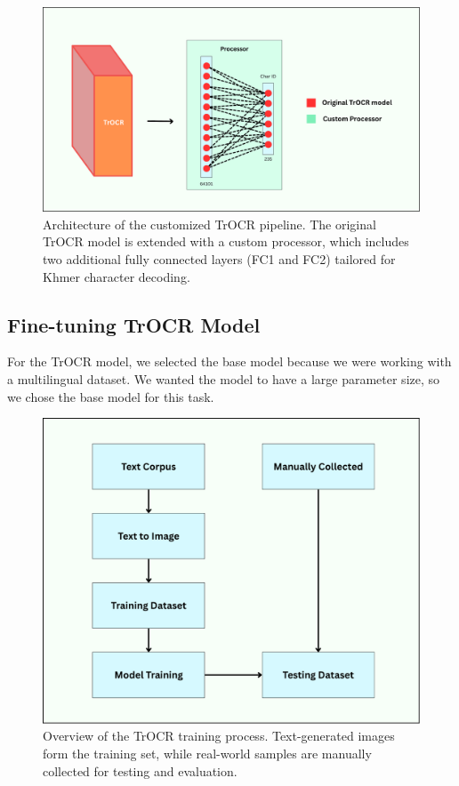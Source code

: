 \begin{figure}[H]
    \centering
    \includegraphics[width=\textwidth]{figures/Customize_processor.png}
    \caption{Architecture of the customized TrOCR pipeline. 
    The original TrOCR model is extended with a custom processor, 
    which includes two additional fully connected layers 
    (FC1 and FC2) tailored for Khmer character decoding.}
    \label{fig:trocr-custom-processor}
\end{figure}



\subsection{Fine-tuning TrOCR Model}
\label{subsec:fine-tuning-trocr-model}
For the TrOCR model, we selected the base model because we were working with a multilingual 
dataset. We wanted the model to have a large parameter size, so we chose the base model for 
this task.

\begin{figure}[H]
    \centering
    \includegraphics[width=\textwidth]{figures/trocr_model_overflow_training.png}
    \caption{Overview of the TrOCR training process. Text-generated 
    images form the training set, while real-world samples are 
    manually collected for testing and evaluation.}
    \label{fig:trocr-training-pipeline}
\end{figure}

